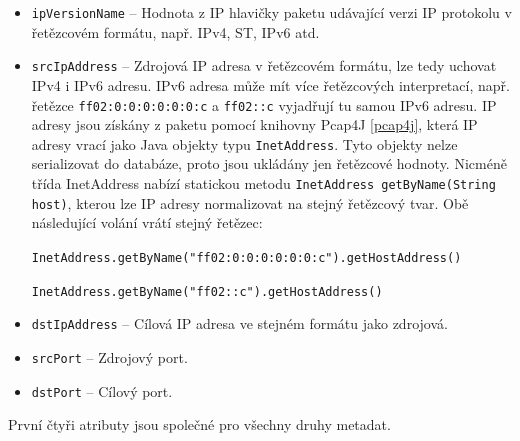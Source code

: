\begin{itemize}
    \item \texttt{ipVersionName} -- Hodnota z IP hlavičky paketu udávající verzi IP protokolu v řetězcovém formátu, např. IPv4, ST, IPv6 atd.
    
    \item \texttt{srcIpAddress} -- Zdrojová IP adresa v řetězcovém formátu, lze tedy uchovat IPv4 i IPv6 adresu. IPv6 adresa může mít více řetězcových interpretací, např. řetězce \texttt{ff02:0:0:0:0:0:0:c} a \texttt{ff02::c} vyjadřují tu samou IPv6 adresu. IP adresy jsou získány z paketu pomocí knihovny Pcap4J \ref{pcap4j}, která IP adresy vrací jako Java objekty typu \texttt{InetAddress}. Tyto objekty nelze serializovat do databáze, proto jsou ukládány jen řetězcové hodnoty. Nicméně třída InetAddress nabízí statickou metodu \texttt{InetAddress 	getByName(String host)}, kterou lze IP adresy normalizovat na stejný řetězcový tvar. Obě následující volání vrátí stejný řetězec:
    
    \indent \texttt{InetAddress.getByName("ff02:0:0:0:0:0:0:c").getHostAddress()}
    
    \indent \texttt{InetAddress.getByName("ff02::c").getHostAddress()}
    
    \item \texttt{dstIpAddress} -- Cílová IP adresa ve stejném formátu jako zdrojová.
    
    \item \texttt{srcPort} -- Zdrojový port.
    
    \item \texttt{dstPort} -- Cílový port.
\end{itemize}

\noindent První čtyři atributy jsou společné pro všechny druhy metadat.

